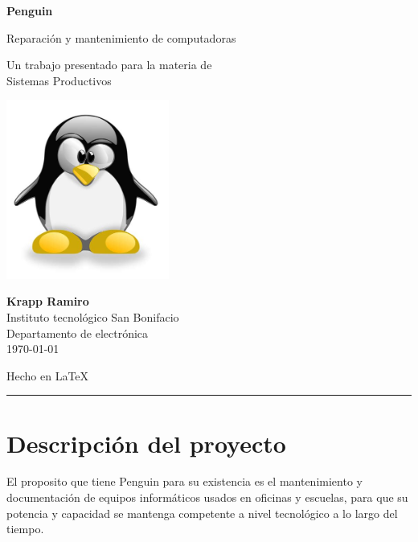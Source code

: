 \documentclass{article}
\begin{document}
\begin{titlepage}
    \begin{center}
        \vspace*{1cm}
            
        \Huge
        \textbf{Penguin}
            
        \vspace{0.3cm}
        \LARGE
        Reparación y mantenimiento de computadoras   
        
        \vspace{0.5cm}
        \Large
        Un trabajo presentado para la materia de \\
        Sistemas Productivos
            
        \vfill
            
        \includegraphics[width=0.4\textwidth]{linux-logo.png}
            
        \Large
        \textbf{Krapp Ramiro} \\
        Instituto tecnológico San Bonifacio\\
        Departamento de electrónica\\
        \today
        
        \vspace{0.5cm}
        \large {Hecho en \LaTeX}
            
    \end{center}
\end{titlepage}

\setcounter{tocdepth}{3}
\tableofcontents
\noindent\rule{\textwidth}{0.7pt}

\pagebreak

\section{Descripción del proyecto}
	El proposito que tiene Penguin para su existencia es el mantenimiento y documentación de equipos informáticos usados en oficinas y escuelas, para que su potencia y capacidad se mantenga competente a nivel tecnológico a lo largo del tiempo.
\end{document}
